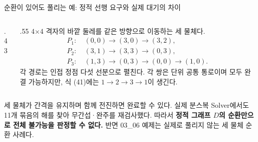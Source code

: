\begin{frame}{순환이 있어도 풀리는 예: 정적 선행 요구와 실제 대기의 차이}
\begin{columns}[T]
\begin{column}{.43\textwidth}\centering
{}
\end{column}\begin{column}{.55\textwidth}\small
4$\times$4 격자의 바깥 둘레를 같은 방향으로 이동하는 세 물체다.
\[
\begin{aligned}
P_1:&\ (0,0)\to(3,0)\to(3,2),\\
P_2:&\ (3,1)\to(3,3)\to(0,3),\\
P_3:&\ (1,3)\to(0,3)\to(0,0)\to(1,0).
\end{aligned}
\]
각 경로는 인접 정점 다섯 선분으로 펼친다.
각 쌍은 단위 공통 통로이며 모두 완결 가능하지만,
식 (41)에는 $1\to2\to3\to1$이 생긴다.
\end{column}\end{columns}
\par\medskip\small
세 물체가 간격을 유지하며 함께 전진하면 완료할 수 있다.
실제 분스복 Solver에서도 11개 묶음의 해를 찾아 무간섭·완주를 재검사했다.
따라서 \textbf{정적 그래프 $D$의 순환만으로 전체 불가능을 판정할 수 없다.}
반면 03\_06 예제는 실제로 풀리지 않는 세 물체 순환 사례다.
\end{frame}


